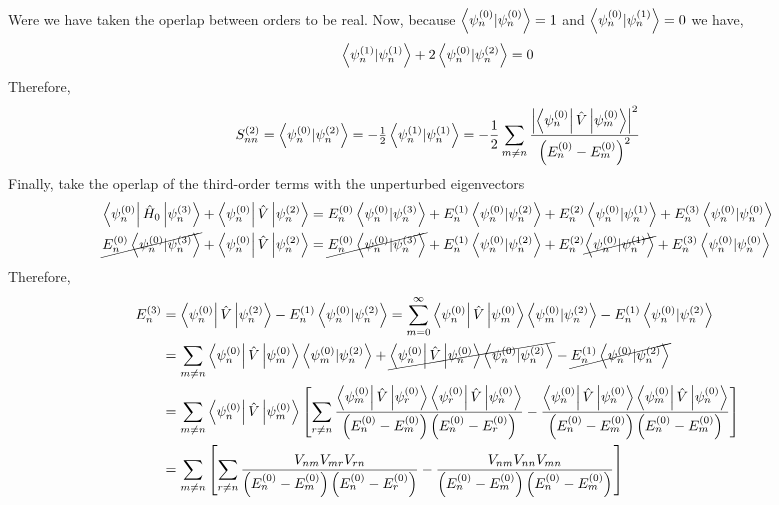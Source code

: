 \documentclass[12pt]{extarticle}
\begin{document}
Were we have taken the operlap between orders to be real. Now, because $\left< \psi^{(0)}_n | \psi^{(0)}_n \right> = 1$ and $\left< \psi^{(0)}_n | \psi^{(1)}_n \right> = 0$ we have,
\[ \left< \psi^{(1)}_n | \psi^{(1)}_n \right> + 2 \left< \psi^{(0)}_n | \psi^{(2)}_n \right> = 0\]
Therefore,
\[S^{(2)}_{nn} = \left< \psi^{(0)}_n | \psi^{(2)}_n \right> = -\tfrac{1}{2} \left< \psi^{(1)}_n | \psi^{(1)}_n \right> = -\frac{1}{2} \sum_{m \neq n} \frac{\left|\left< \psi^{(0)}_n \right| \hat{V} \left| \psi^{(0)}_m \right> \right|^2}{\left(E^{(0)}_n - E^{(0)}_m \right)^2}\]
Finally, take the operlap of the third-order terms with the unperturbed eigenvectors
\begin{align*}
\left< \psi^{(0)}_n \right| \hat{H}_0 \left| \psi^{(3)}_n \right> + \left< \psi^{(0)}_n \right| \hat{V} \left| \psi^{(2)}_n \right> &= E^{(0)}_n \left< \psi^{(0)}_n | \psi^{(3)}_n \right> +  E^{(1)}_n \left< \psi^{(0)}_n | \psi^{(2)}_n \right> +  E^{(2)}_n \left< \psi^{(0)}_n | \psi^{(1)}_n \right> + E^{(3)}_n \left< \psi^{(0)}_n | \psi^{(0)}_n \right> \\
\cancel{E^{(0)}_n \left< \psi^{(0)}_n | \psi^{(3)}_n \right>} + \left< \psi^{(0)}_n \right| \hat{V} \left| \psi^{(2)}_n \right> &= \cancel{E^{(0)}_n \left< \psi^{(0)}_n | \psi^{(3)}_n \right>} +  E^{(1)}_n \left< \psi^{(0)}_n | \psi^{(2)}_n \right> +  E^{(2)}_n \cancel{\left< \psi^{(0)}_n | \psi^{(1)}_n \right>} + E^{(3)}_n \left< \psi^{(0)}_n | \psi^{(0)}_n \right>
\end{align*}
Therefore,
\begin{align*}
E^{(3)}_n & = \left< \psi^{(0)}_n \right| \hat{V} \left| \psi^{(2)}_n \right> - E^{(1)}_n \left< \psi^{(0)}_n | \psi^{(2)}_n \right> = \sum_{m = 0}^\infty \left< \psi^{(0)}_n \right| \hat{V} \left| \psi^{(0)}_m \right> \left< \psi^{(0)}_m | \psi^{(2)}_n \right> - E^{(1)}_n \left< \psi^{(0)}_n | \psi^{(2)}_n \right> \\
& = \sum_{m \neq n} \left< \psi^{(0)}_n \right| \hat{V} \left| \psi^{(0)}_m \right> \left< \psi^{(0)}_m | \psi^{(2)}_n \right> + \cancel{\left< \psi^{(0)}_n \right| \hat{V} \left| \psi^{(0)}_n \right> \left< \psi^{(0)}_n | \psi^{(2)}_n \right>} - \cancel{E^{(1)}_n \left< \psi^{(0)}_n | \psi^{(2)}_n \right>} \\
& = \sum_{m \neq n} \left< \psi^{(0)}_n \right| \hat{V} \left| \psi^{(0)}_m \right> \left[ \sum_{r \neq n} \frac{ \left< \psi^{(0)}_m \right| \hat{V} \left| \psi^{(0)}_r \right> \left< \psi^{(0)}_r \right| \hat{V} \left| \psi^{(0)}_n \right>}{\left(E^{(0)}_n - E^{(0)}_m \right)\left(E^{(0)}_n - E^{(0)}_r \right)} - \frac{ \left< \psi^{(0)}_n \right| \hat{V} \left| \psi^{(0)}_n \right> \left< \psi^{(0)}_m \right| \hat{V} \left| \psi^{(0)}_n \right>}{\left(E^{(0)}_n - E^{(0)}_m \right)\left(E^{(0)}_n - E^{(0)}_m \right)}\right] \\
& = \sum_{m \neq n} \left[ \sum_{r \neq n} \frac{V_{nm} V_{mr} V_{rn}}{\left(E^{(0)}_n - E^{(0)}_m \right)\left(E^{(0)}_n - E^{(0)}_r \right)} - \frac{ V_{nm} V_{nn} V_{mn}}{\left(E^{(0)}_n - E^{(0)}_m \right)\left(E^{(0)}_n - E^{(0)}_m \right)}\right]
\end{align*}
\end{document}

